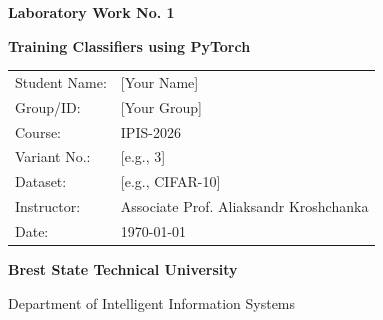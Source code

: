 \documentclass[12pt, a4paper]{article}
\begin{document}
\begin{titlepage}
    \centering
    \vspace*{2cm}
    
    {\Huge \bfseries \textcolor{primary}{Laboratory Work No. 1} \par}
    \vspace{0.5cm}
    {\LARGE \textbf{Training Classifiers using PyTorch} \par}
    \vspace{2cm}
    
    \begin{table}[h]
        \centering
        \large
        \renewcommand{\arraystretch}{1.5}
        \begin{tabular}{l l}
            Student Name: & [Your Name] \\
            Group/ID: & [Your Group] \\
            Course: & IPIS-2026 \\
            Variant No.: & [e.g., 3] \\
            Dataset: & [e.g., CIFAR-10] \\
            Instructor: & Associate Prof. Aliaksandr Kroshchanka \\
            Date: & \today \\
        \end{tabular}
    \end{table}
    
    \vfill
    {\large \textbf{Brest State Technical University} \par}
    {\large Department of Intelligent Information Systems \par}
    \vspace*{2cm}
\end{titlepage}

\begin{abstract}
    \noindent This report details the implementation and evaluation of a Convolutional Neural Network (CNN) built with the PyTorch framework. The primary objective is to construct a neural network classifier and train it on a standard computer vision dataset from \texttt{torchvision.datasets}. The report covers model architecture design, training optimization using a specific optimizer, evaluation of testing accuracy, and comparison with state-of-the-art results.
\end{abstract}
\end{document}
